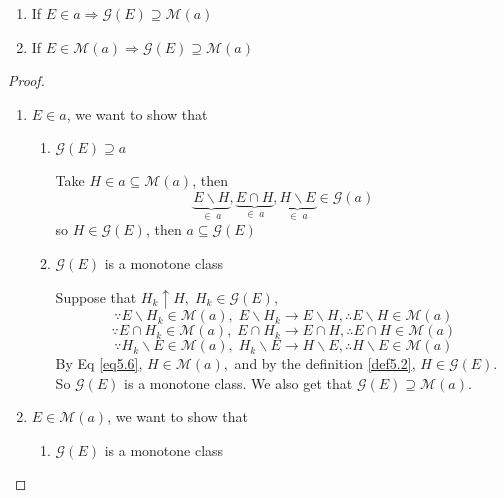 \begin{lemma}
	\text{}
	\begin{enumerate}
		\item If $ E \in a \Rightarrow \mathcal{G}(E) \supseteq \mathcal{M}(a) $
		\item If $ E \in \mathcal{M}(a) \Rightarrow \mathcal{G}(E) \supseteq \mathcal{M}(a) $
	\end{enumerate}
\label{lmk5.1}
\end{lemma}

\begin{proof}
	\text{}
	\begin{enumerate}
		\item  $ E \in a $,  we want to show that 
		\begin{enumerate}
			\item $ \mathcal{G}(E) \supseteq a $
			
			Take $ H \in a \subseteq \mathcal{M}(a)$, then
			\begin{equation}
			\underbrace {E\backslash H}_{ \in \;a},\underbrace {E \cap H}_{ \in \;a},\underbrace {H\backslash E}_{ \in \;a} \in \mathcal{G}\left( a \right)
			\label{eq5.3}
			\end{equation}
			so $H \in \mathcal{G}\left( E \right)$, then $a \subseteq \mathcal{G}\left( E \right)$
			\item $ \mathcal{G}(E) $ is a monotone class
			
			Suppose that ${H_k} \uparrow H,\;{H_k} \in \mathcal{G}\left( E \right)$,
			\begin{equation}
			\because  E\backslash {H_k} \in \mathcal{M}\left( a \right),\;E\backslash {H_k} \to E\backslash H , \therefore  E\backslash H \in \mathcal{M}\left( a \right)
			\label{eq5.4}
			\end{equation}
			\begin{equation}
			\because E \cap {H_k} \in \mathcal{M}\left( a \right),\;E \cap {H_k} \to E \cap H,\therefore E \cap H \in {\mathcal{M}}\left( a \right)
			\label{eq5.5}
			\end{equation}
			\begin{equation}
			\because {H_k}\backslash E \in \mathcal{M}\left( a \right),\;{H_k}\backslash E \to H\backslash E,\therefore H\backslash E \in \mathcal{M}\left( a \right)
			\label{eq5.6}
			\end{equation}
			By Eq \ref{eq5.6}, $ H \in \mathcal{M}(a), $ and by the definition \ref{def5.2}, $ H \in \mathcal{G}(E). $ So $ \mathcal{G}(E) $ is a monotone class. We also get that
			$ \mathcal{G}(E)  \supseteq \mathcal{M}(a).$
		\end{enumerate}
		\item $ E \in \mathcal{M}(a) $, we want to show that 
		\begin{enumerate}
			\item $ \mathcal{G}(E) $ is a monotone class 
			

\end{enumerate}
\end{enumerate}
\end{proof}
